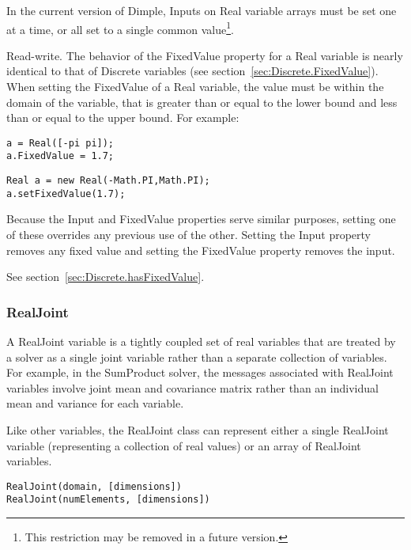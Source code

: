 \ifmatlab
In the current version of Dimple, Inputs on Real variable arrays must be set one at a time, or all set to a single common value\footnote{This restriction may be removed in a future version.}.
\fi


Read-write.  The behavior of the FixedValue property for a Real variable is nearly identical to that of Discrete variables (see section~\ref{sec:Discrete.FixedValue}).  When setting the FixedValue of a Real variable, the value must be within the domain of the variable, that is greater than or equal to the lower bound and less than or equal to the upper bound.  For example:

\ifmatlab
\begin{lstlisting}
a = Real([-pi pi]);
a.FixedValue = 1.7;
\end{lstlisting}
\fi

\ifjava
\begin{lstlisting}
Real a = new Real(-Math.PI,Math.PI);
a.setFixedValue(1.7);
\end{lstlisting}
\fi

Because the Input and FixedValue properties serve similar purposes, setting one of these overrides any previous use of the other.  Setting the Input property removes any fixed value and setting the FixedValue property removes the input.




See section~\ref{sec:Discrete.hasFixedValue}.



\subsubsection{RealJoint}

A RealJoint variable is a tightly coupled set of real variables that are treated by a solver as a single joint variable rather than a separate collection of variables.  For example, in the SumProduct solver, the messages associated with RealJoint variables involve joint mean and covariance matrix rather than an individual mean and variance for each variable.

Like other variables, the RealJoint class can represent either a single RealJoint variable (representing a collection of real values) or an array of RealJoint variables.


\ifmatlab
\begin{lstlisting}
RealJoint(domain, [dimensions])
RealJoint(numElements, [dimensions])
\end{lstlisting}

